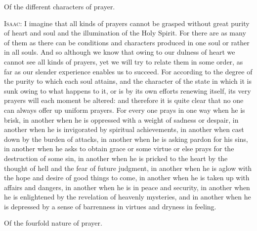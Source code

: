 
Of the different characters of prayer.

\textsc{Isaac}: I imagine that all kinds of prayers cannot be grasped without great purity of heart and soul and the illumination of the Holy Spirit. For there are as many of them as there can be conditions and characters produced in one soul or rather in all souls. And so although we know that owing to our dulness of heart we cannot see all kinds of prayers, yet we will try to relate them in some order, as far as our slender experience enables us to succeed. For according to the degree of the purity to which each soul attains, and the character of the state in which it is sunk owing to what happens to it, or is by its own efforts renewing itself, its very prayers will each moment be altered: and therefore it is quite clear that no one can always offer up uniform prayers. For every one prays in one way when he is brisk, in another when he is oppressed with a weight of sadness or despair, in another when he is invigorated by spiritual achievements, in another when cast down by the burden of attacks, in another when he is asking pardon for his sins, in another when he asks to obtain grace or some virtue or else prays for the destruction of some sin, in another when he is pricked to the heart by the thought of hell and the fear of future judgment, in another when he is aglow with the hope and desire of good things to come, in another when he is taken up with affairs and dangers, in another when he is in peace and security, in another when he is enlightened by the revelation of heavenly mysteries, and in another when he is depressed by a sense of barrenness in virtues and dryness in feeling.


Of the fourfold nature of prayer.

